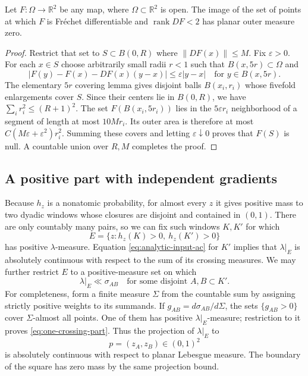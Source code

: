 \begin{lemma}\label{lem:critical-image-null}
Let $F:\Omega\to\mathbb R^2$ be any map, where $\Omega\subset\mathbb R^2$
is open.  The image of the set of points at which $F$ is Fr\'echet
differentiable and $\operatorname{rank}DF<2$ has planar outer measure zero.
\end{lemma}

\begin{proof}
Restrict that set to $S\subset B(0,R)$ where $\|DF(x)\|\le M$.
Fix $\varepsilon>0$.  For each $x\in S$ choose arbitrarily small radii
$r<1$ such that $B(x,5r)\subset\Omega$ and
\[
 |F(y)-F(x)-DF(x)(y-x)|\le\varepsilon|y-x|
 \quad\text{for }y\in B(x,5r).
\]
The elementary $5r$ covering lemma gives disjoint balls $B(x_i,r_i)$
whose fivefold enlargements cover $S$.  Since their centers lie in
$B(0,R)$, we have $\sum_i r_i^2\le (R+1)^2$.
The set $F(B(x_i,5r_i))$ lies in the $5\varepsilon r_i$ neighborhood
of a segment of length at most $10Mr_i$.  Its outer area is therefore
at most $C(M\varepsilon+\varepsilon^2)r_i^2$.
Summing these covers and letting $\varepsilon\downarrow0$ proves
that $F(S)$ is null.  A countable union over $R,M$ completes the proof.
\end{proof}

\subsection{A positive part with independent gradients}

Because $h_z$ is a nonatomic probability, for almost every $z$ it gives
positive mass to two dyadic windows whose closures are disjoint and
contained in $(0,1)$.  There are only countably many pairs, so we can
fix such windows $K,K'$ for which
\[
 E=\{z:h_z(K)>0,\ h_z(K')>0\}
\]
has positive $\lambda$-measure.  Equation
\eqref{eq:analytic-input-ac} for $K'$ implies that $\lambda|_E$ is
absolutely continuous with respect to the sum of its crossing measures.
We may further restrict $E$ to a positive-measure set on which
\begin{equation}
 \lambda|_E\ll\sigma_{AB}
 \quad\text{for some disjoint }A,B\subset K'.
 \label{eq:one-crossing-part}
\end{equation}
For completeness, form a finite measure $\Sigma$ from the countable sum
by assigning strictly positive weights to its summands.
If $g_{AB}=d\sigma_{AB}/d\Sigma$, the sets $\{g_{AB}>0\}$ cover
$\Sigma$-almost all points.  One of them has positive
$\lambda|_E$-measure; restriction to it proves
\eqref{eq:one-crossing-part}.
Thus the projection of $\lambda|_E$ to
\[
 p=(z_A,z_B)\in(0,1)^2
\]
is absolutely continuous with respect to planar Lebesgue measure.
The boundary of the square has zero mass by the same projection bound.


